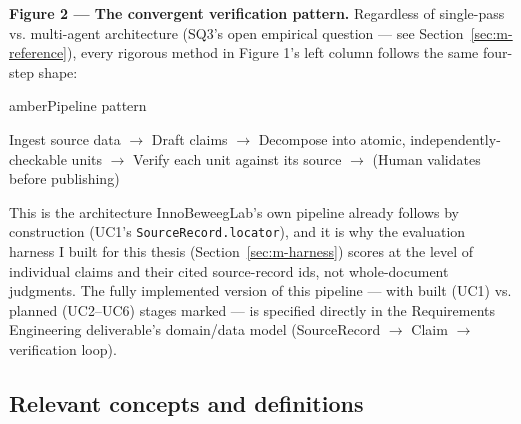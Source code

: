 \textbf{Figure 2 — The convergent verification pattern.} Regardless of single-pass vs. multi-agent architecture (SQ3's open empirical question — see Section~\ref{sec:m-reference}), every rigorous method in Figure 1's left column follows the same four-step shape:



\begin{calloutbox}{amber}{Pipeline pattern}

\centering Ingest source data $\rightarrow$ Draft claims $\rightarrow$ Decompose into atomic, independently-checkable units $\rightarrow$ Verify each unit against its source $\rightarrow$ (Human validates before publishing)

\end{calloutbox}

This is the architecture InnoBeweegLab's own pipeline already follows by construction (UC1's \texttt{SourceRecord.locator}), and it is why the evaluation harness I built for this thesis (Section~\ref{sec:m-harness}) scores at the level of individual claims and their cited source-record ids, not whole-document judgments. The fully implemented version of this pipeline — with built (UC1) vs. planned (UC2–UC6) stages marked — is specified directly in the Requirements Engineering deliverable's domain/data model (SourceRecord $\rightarrow$ Claim $\rightarrow$ verification loop).



\subsection{Relevant concepts and definitions}\label{sec:definitions}

